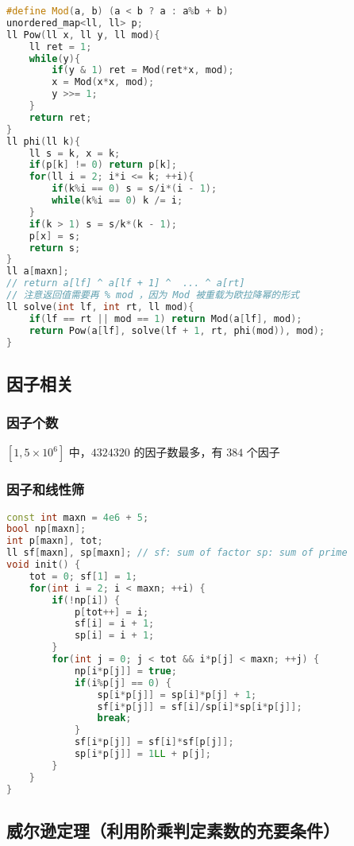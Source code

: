 \begin{lstlisting}[language=C++]
#define Mod(a, b) (a < b ? a : a%b + b)
unordered_map<ll, ll> p;
ll Pow(ll x, ll y, ll mod){
    ll ret = 1;
    while(y){
        if(y & 1) ret = Mod(ret*x, mod);
        x = Mod(x*x, mod);
        y >>= 1;
    }
    return ret;
}
ll phi(ll k){
    ll s = k, x = k;
    if(p[k] != 0) return p[k];
    for(ll i = 2; i*i <= k; ++i){
        if(k%i == 0) s = s/i*(i - 1);
        while(k%i == 0) k /= i;
    }
    if(k > 1) s = s/k*(k - 1);
    p[x] = s;
    return s;
}
ll a[maxn];
// return a[lf] ^ a[lf + 1] ^  ... ^ a[rt]
// 注意返回值需要再 % mod ，因为 Mod 被重载为欧拉降幂的形式
ll solve(int lf, int rt, ll mod){
    if(lf == rt || mod == 1) return Mod(a[lf], mod);
    return Pow(a[lf], solve(lf + 1, rt, phi(mod)), mod);
}
\end{lstlisting}

\subsection{因子相关}

\subsubsection{因子个数}

$[1, 5 \times 10^6]$ 中，$4324320$ 的因子数最多，有 $384$ 个因子

\subsubsection{因子和线性筛}

\begin{lstlisting}[language=C++]
const int maxn = 4e6 + 5;
bool np[maxn];
int p[maxn], tot;
ll sf[maxn], sp[maxn]; // sf: sum of factor sp: sum of prime
void init() {
    tot = 0; sf[1] = 1;
    for(int i = 2; i < maxn; ++i) {
        if(!np[i]) {
            p[tot++] = i;
            sf[i] = i + 1;
            sp[i] = i + 1;
        }
        for(int j = 0; j < tot && i*p[j] < maxn; ++j) {
            np[i*p[j]] = true;
            if(i%p[j] == 0) {
                sp[i*p[j]] = sp[i]*p[j] + 1;
                sf[i*p[j]] = sf[i]/sp[i]*sp[i*p[j]];
                break;
            }
            sf[i*p[j]] = sf[i]*sf[p[j]];
            sp[i*p[j]] = 1LL + p[j];
        }
    }
}
\end{lstlisting}

\subsection{威尔逊定理（利用阶乘判定素数的充要条件）}

